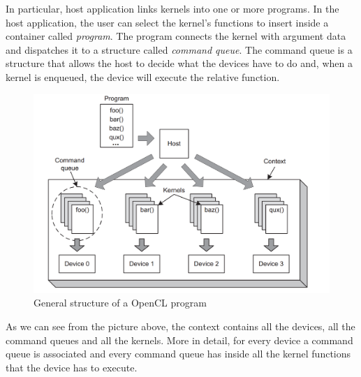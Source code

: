 In particular, host application links kernels into one or more
programs. In the host application, the user can select the kernel's
functions to insert inside a container called \emph{program}.  The
program connects the kernel with argument data and dispatches it to a
structure called \emph{command queue}.  The command queue is a structure that
allows the host to decide what the devices have to do and, when a
kernel is enqueued, the device will execute the relative function.

\begin{figure}[htp]
  \begin{center}
    \includegraphics[width=12cm]{./images/OpenCAL-CL/kernelDistribution}
    \caption{General structure of a OpenCL program}
    \label{fig:GeneralStructure}
  \end{center}
\end{figure}

As we can see from the picture above, the context contains all the
devices, all the command queues and all the kernels.  More in detail,
for every device a command queue is associated and every command queue
has inside all the kernel functions that the device has to execute.

